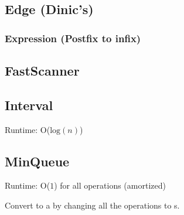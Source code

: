 \subsection*{Edge (Dinic's)}



\subsubsection*{Expression (Postfix to infix)}



\subsection*{FastScanner}



\subsection*{Interval}

Runtime: O($\text{log}(n)$)



\subsection*{MinQueue}

Runtime: O($1$) for all operations (amortized)

Convert to a  by changing all the  operations to s.




\newpage